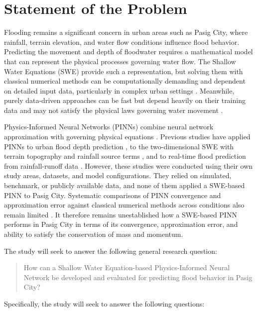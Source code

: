 \section{Statement of the Problem}

Flooding remains a significant concern in urban areas such as Pasig City, where rainfall, terrain elevation, and water flow conditions influence flood behavior. Predicting the movement and depth of floodwater requires a mathematical model that can represent the physical processes governing water flow. The Shallow Water Equations (SWE) provide such a representation, but solving them with classical numerical methods can be computationally demanding and dependent on detailed input data, particularly in complex urban settings \cite{guo2021,liu2026}. Meanwhile, purely data-driven approaches can be fast but depend heavily on their training data and may not satisfy the physical laws governing water movement \cite{liu2026,hybridreview2026}.

Physics-Informed Neural Networks (PINNs) combine neural network approximation with governing physical equations \cite{raissi2019}. Previous studies have applied PINNs to urban flood depth prediction \cite{liu2026}, to the two-dimensional SWE with terrain topography and rainfall source terms \cite{tian2025}, and to real-time flood prediction from rainfall-runoff data \cite{praveen2024}. However, these studies were conducted using their own study areas, datasets, and model configurations. They relied on simulated, benchmark, or publicly available data, and none of them applied a SWE-based PINN to Pasig City. Systematic comparisons of PINN convergence and approximation error against classical numerical methods across conditions also remain limited \cite{tian2025,hybridreview2026}. It therefore remains unestablished how a SWE-based PINN performs in Pasig City in terms of its convergence, approximation error, and ability to satisfy the conservation of mass and momentum.

The study will seek to answer the following general research question:

\begin{quote}
How can a Shallow Water Equation-based Physics-Informed Neural Network be developed and evaluated for predicting flood behavior in Pasig City?
\end{quote}

Specifically, the study will seek to answer the following questions:

